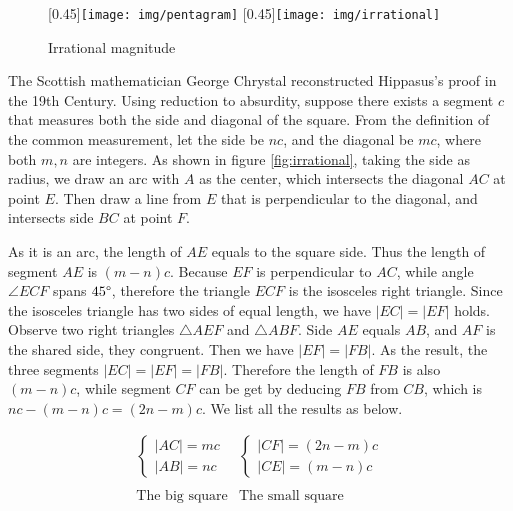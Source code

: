 \documentclass[b5paper]{article}
\begin{document}
\begin{figure}[htbp]
 \centering
 [0.45\linewidth]{\texttt{[image: img/pentagram]}}
 [0.45\linewidth]{\texttt{[image: img/irrational]}}
 \caption{Irrational magnitude}
 \label{fig:irrational}
 \label{fig:pentagram}
\end{figure}

The Scottish mathematician George Chrystal reconstructed Hippasus's proof in the 19th Century. Using reduction to absurdity, suppose there exists a segment $c$ that measures both the side and diagonal of the square. From the definition of the common measurement, let the side be $nc$, and the diagonal be $mc$, where both $m, n$ are integers. As shown in figure \ref{fig:irrational}, taking the side as radius, we draw an arc with $A$ as the center, which intersects the diagonal $AC$ at point $E$. Then draw a line from $E$ that is perpendicular to the diagonal, and intersects side $BC$ at point $F$.

As it is an arc, the length of $AE$ equals to the square side. Thus the length of segment $AE$ is $(m - n)c$. Because $EF$ is perpendicular to $AC$, while angle $\angle ECF$ spans $45\degree$, therefore the triangle $ECF$ is the isosceles right triangle. Since the isosceles triangle has two sides of equal length, we have $|EC| = |EF|$ holds. Observe two right triangles $\triangle AEF$ and $\triangle ABF$. Side $AE$ equals $AB$, and $AF$ is the shared side, they congruent. Then we have $|EF| = |FB|$. As the result, the three segments $|EC| = |EF| = |FB|$. Therefore the length of $FB$ is also $(m - n)c$, while segment $CF$ can be get by deducing $FB$ from $CB$, which is $nc - (m - n)c = (2n - m)c$. We list all the results as below.

\[
\begin{array}{c|c}
\begin{cases}
|AC| = mc \\
|AB| = nc
\end{cases} &
\begin{cases}
|CF| = (2n - m)c \\
|CE| = (m - n)c
\end{cases} \\[4ex]
\\
\text{The big square} & \text{The small square}
\end{array}
\]
\end{document}
